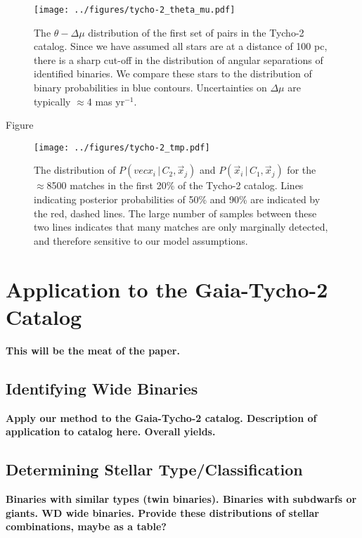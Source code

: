 \documentclass[usenatbib]{mnras}
\newcommand{\given}{\,|\,}
\begin{document}
\begin{figure}
\begin{center}
\texttt{[image: ../figures/tycho-2\_theta\_mu.pdf]}
\caption{ The $\theta-\Delta \mu$ distribution of the first set of pairs in the Tycho-2 catalog. Since we have assumed all stars are at a distance of 100 pc, there is a sharp cut-off in the distribution of angular separations of identified binaries. We compare these stars to the distribution of binary probabilities in blue contours. Uncertainties on $\Delta \mu$ are typically $\approx$4 mas yr$^{-1}$. }
\label{fig:tycho-2_theta_mu}
\end{center}
\end{figure}



Figure 





\begin{figure}
\begin{center}
\texttt{[image: ../figures/tycho-2\_tmp.pdf]}
\caption{ The distribution of $P(vec{x}_i \given C_2, \vec{x}_j)$ and $P(\vec{x}_i \given C_1, \vec{x}_j)$ for the $\approx$8500 matches in the first 20\% of the Tycho-2 catalog. Lines indicating posterior probabilities of 50\% and 90\% are indicated by the red, dashed lines. The large number of samples between these two lines indicates that many matches are only marginally detected, and therefore sensitive to our model assumptions. }
\label{fig:tycho-2_tmp}
\end{center}
\end{figure}




\section{Application to the Gaia-Tycho-2 Catalog}

{\bf This will be the meat of the paper.}

\subsection{Identifying Wide Binaries}
{\bf Apply our method to the Gaia-Tycho-2 catalog. Description of application to catalog here. Overall yields.}

\subsection{Determining Stellar Type/Classification}
{\bf Binaries with similar types (twin binaries). Binaries with subdwarfs or giants. WD wide binaries. Provide these distributions of stellar combinations, maybe as a table?}
\end{document}
